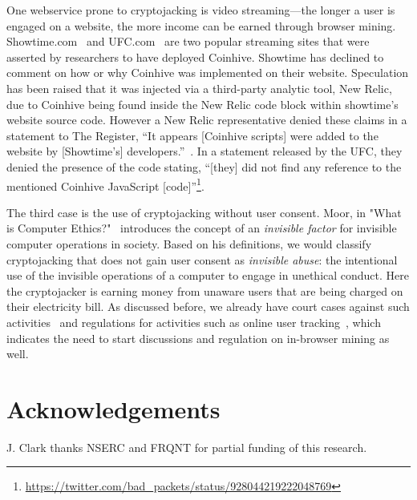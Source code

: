 One webservice prone to cryptojacking is video streaming---the longer a user is engaged on a website, the more income can be earned through browser mining. Showtime.com~\cite{registershowtime} and UFC.com~\cite{registerufcmonero} are two popular streaming sites that were asserted by researchers to have deployed Coinhive. Showtime has declined to comment on how or why Coinhive was implemented on their website. Speculation has been raised that it was injected via a third-party analytic tool, New Relic, due to Coinhive being found inside the New Relic code block within showtime's website source code. However a New Relic representative denied these claims in a statement to The Register, ``It appears [Coinhive scripts] were added to the website by [Showtime's] developers.''~\cite{registershowtime}. In a statement released by the UFC, they denied the presence of the code stating, ``[they] did not find any reference to the mentioned Coinhive JavaScript [code]''\footnote{\url{https://twitter.com/bad_packets/status/928044219222048769}}.

The third case is the use of cryptojacking without user consent. Moor, in "What is Computer Ethics?"~\cite{moor1985computer} introduces the concept of an \textit{invisible factor} for invisible computer operations in society. Based on his definitions, we would classify cryptojacking that does not gain user consent as \textit{invisible abuse}: the intentional use of the invisible operations of a computer to engage in unethical conduct. Here the cryptojacker is earning money from unaware users that are being charged on their electricity bill. As discussed before, we already have court cases against such activities~\cite{njcourtbitcoinjsminer} and regulations for activities such as online user tracking~\cite{eucookie}, which indicates the need to start discussions and regulation on in-browser mining as well. 


\section{Acknowledgements}

J. Clark thanks NSERC and FRQNT for partial funding of this research. 















